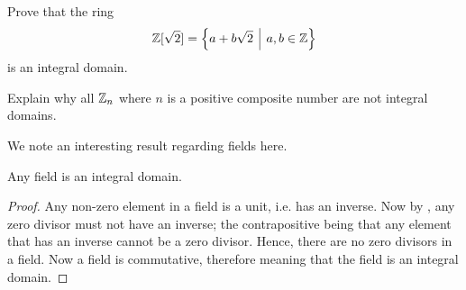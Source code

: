 \begin{exercise}
    Prove that the ring
    \[
        \Z[\sqrt2] = \left\{a + b\sqrt2 \vert a,b \in \Z\right\}
    \]
    is an integral domain.
\end{exercise}
\begin{exercise}
    Explain why all $\mathbb{Z}_n$ where $n$ is a positive composite number are not integral domains.
\end{exercise}

\newpage

We note an interesting result regarding fields here.
\begin{proposition}\label{prop-field-is-integral-domain}
    Any field is an integral domain.
\end{proposition}
\begin{proof}
    Any non-zero element in a field is a unit, i.e. has an inverse. Now by , any zero divisor must not have an inverse; the contrapositive being that any element that has an inverse cannot be a zero divisor. Hence, there are no zero divisors in a field. Now a field is commutative, therefore meaning that the field is an integral domain.
\end{proof}

